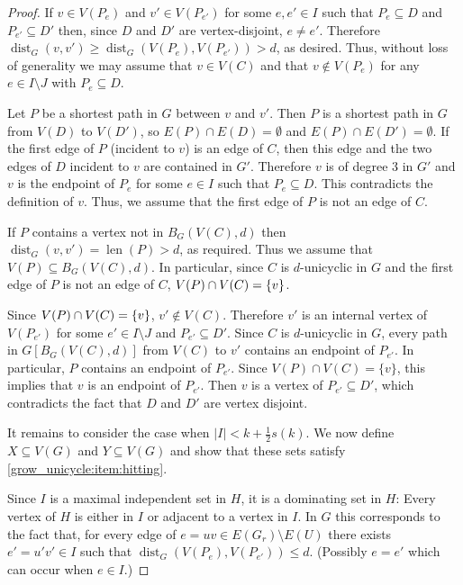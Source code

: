 \documentclass{patmorin}
\DeclareMathOperator{\len}{len}
\DeclareMathOperator{\dist}{dist}
\DeclarePairedDelimiter\set{\{}{\}}
\begin{document}
\begin{proof}
    If $v\in V(P_e)$ and $v'\in V(P_{e'})$ for some  $e,e' \in I$ such that $P_e\subseteq D$ and $P_{e'}\subseteq D'$ then,
    since $D$ and $D'$ are vertex-disjoint, $e\neq e'$. Therefore
    $\dist_G(v,v')\geq  \dist_G(V(P_e),V(P_{e'}))>d$, as desired.  Thus, without loss of generality we may assume that $v\in V(C)$ and that $v\notin V(P_e)$ for any $e\in I\setminus J$ with $P_e\subseteq D$.

    Let $P$ be a shortest path in $G$ between $v$ and $v'$.  Then $P$ is a shortest path in $G$ from $V(D)$ to $V(D')$, so $E(P)\cap E(D)=\emptyset$ and $E(P)\cap E(D')=\emptyset$.  If the first edge of $P$ (incident to $v$) is an edge of $C$, then this edge and the two edges of $D$ incident to $v$ are contained in $G'$. Therefore $v$ is of degree $3$ in $G'$ and $v$ is the endpoint of $P_e$ for some $e\in I$ such that $P_e\subseteq D$.  This contradicts the definition of $v$.
    Thus, we assume that the first edge of $P$ is not an edge of $C$.

    If $P$ contains a vertex not in $B_G(V(C),d)$ then $\dist_G(v,v')=\len(P)>d$, as required.  Thus we assume that $V(P)\subseteq B_G(V(C),d)$.
    In particular, since $C$ is $d$-unicyclic in $G$ and the first edge of $P$ is not an edge of $C$, $V(P)\cap V(C)=\set{v}$.

    Since $V(P)\cap V(C)=\set{v}$,  $v'\notin V(C)$.  Therefore $v'$ is an internal vertex of $V(P_{e'})$ for some $e'\in I\setminus J$ and $P_{e'}\subseteq D'$.  Since $C$ is $d$-unicyclic in $G$, every path in $G[B_G(V(C),d)]$ from $V(C)$ to $v'$ contains an endpoint of $P_{e'}$.  In particular, $P$ contains an endpoint of $P_{e'}$.  Since $V(P)\cap V(C)=\{v\}$, this implies that $v$ is an endpoint of $P_{e'}$.  Then $v$ is a vertex of $P_{e'}\subseteq D'$, which contradicts the fact that $D$ and $D'$ are vertex disjoint.

  It remains to consider the case when $|I| < k+\frac{1}{2}s(k)$.  We now define $X\subseteq V(G)$ and $Y\subseteq V(G)$ and show that these sets satisfy \cref{grow_unicycle:item:hitting}.

  Since $I$ is a maximal independent set in $H$, it is a dominating set in $H$: Every vertex of $H$ is either in $I$ or adjacent to a vertex in $I$.  In $G$ this corresponds to the fact that, for every edge of $e=uv\in E(G_r)\setminus E(U)$ there exists $e'=u'v'\in I$ such that $\dist_G(V(P_{e}),V(P_{e'}))\le d$.  (Possibly $e=e'$ which can occur when $e\in I$.)


\end{proof}
\end{document}
